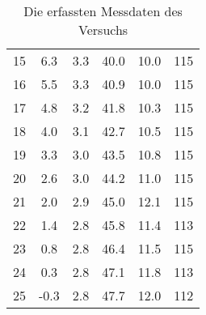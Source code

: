 \begin{table}
\begin{tabular}[]{S[table-format=2.0] S S[table-format=1.1] S S S[table-format=3.0]}
       15 &  6.3  &  3.3 & 40.0  &  10.0  &  115 \\
       16 &  5.5  &  3.3 & 40.9  &  10.0  &  115 \\
       17 &  4.8  &  3.2 & 41.8  &  10.3  &  115 \\
       18 &  4.0  &  3.1 & 42.7  &  10.5  &  115 \\
       19 &  3.3  &  3.0 & 43.5  &  10.8  &  115 \\
       20 &  2.6  &  3.0 & 44.2  &  11.0  &  115 \\
       21 &  2.0  &  2.9 & 45.0  &  12.1  &  115 \\
       22 &  1.4  &  2.8 & 45.8  &  11.4  &  113 \\
       23 &  0.8  &  2.8 & 46.4  &  11.5  &  115 \\
       24 &  0.3  &  2.8 & 47.1  &  11.8  &  113 \\
       25 & -0.3  &  2.8 & 47.7  &  12.0  &  112 \\
    \bottomrule
    \end{tabular}
    \caption[]{Die erfassten Messdaten des Versuchs}
    \label{tab:messdaten}
\end{table}